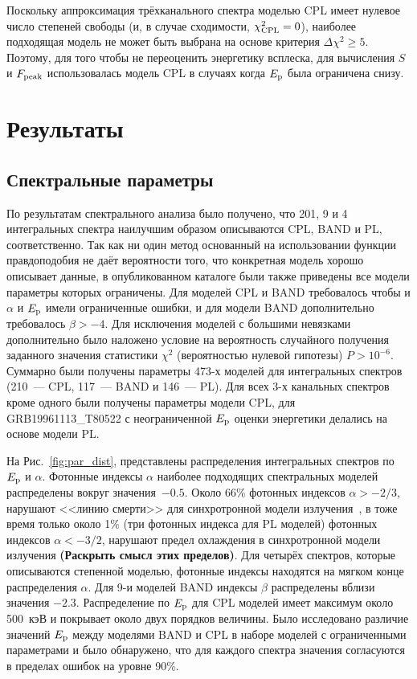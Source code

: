 Поскольку аппроксимация трёхканального спектра моделью CPL имеет нулевое число степеней свободы
(и, в случае сходимости, $\chi_{\mathrm{CPL}}^2=0$), наиболее подходящая модель 
не может быть выбрана на основе критерия $\Delta \chi^2 \geq 5$.
Поэтому, для того чтобы не переоценить энергетику всплеска, для вычисления $S$ и $F_{\mathrm{peak}}$
использовалась модель CPL в случаях когда $E_{\mathrm{p}}$ была ограничена снизу.

\section{Результаты}\label{sec:RESULTS}
\subsection{Спектральные параметры}
По результатам спектрального анализа было получено, что 201, 9 и 4 интегральных 
спектра наилучшим образом описываются CPL, BAND и PL, соответственно. 
Так как ни один метод основанный на использовании функции правдоподобия не даёт 
вероятности того, что конкретная модель хорошо описывает данные, в опубликованном 
каталоге были также приведены все модели параметры которых ограничены.
Для моделей CPL и BAND требовалось чтобы и $\alpha$ и $E_{\mathrm{p}}$ имели ограниченные ошибки,
и для модели BAND дополнительно требовалось $\beta > -4$. Для исключения моделей
с большими невязками дополнительно было наложено условие на вероятность 
случайного получения заданного значения статистики $\chi^2$ 
(вероятностью нулевой гипотезы) $P> 10^{-6}$. 
Суммарно были получены параметры 473-х моделей
для интегральных спектров (210~--- CPL, 117~--- BAND и 146~--- PL).
Для всех 3-х канальных спектров кроме одного были получены параметры модели CPL, для GRB19961113\_T80522 с 
неограниченной $E_{\mathrm{p}}$ оценки энергетики делались на основе модели PL\footnotemark. 


На Рис.~\ref{fig:par_dist}, представлены распределения интегральных спектров по $E_{\mathrm{p}}$ и $\alpha$.
Фотонные индексы $\alpha$ наиболее подходящих спектральных моделей распределены 
вокруг значения~$-0.5$. 
Около 66\% фотонных индексов $\alpha > -2/3$, нарушают <<линию смерти>> для 
синхротронной модели излучения~\citep{Preece_1998ApJL}, в тоже время только около 
1\% (три фотонных индекса для PL моделей) фотонных индексов $\alpha< -3/2$, 
нарушают предел охлаждения в синхротронной модели излучения \textbf{(Раскрыть смысл этих пределов)}. 
Для четырёх спектров, которые описываются степенной моделью, фотонные индексы 
находятся на мягком конце распределения $\alpha$. Для 9-и моделей BAND индексы $\beta$
распределены вблизи значения $-2.3$.
Распределение по $E_{\mathrm{p}}$ для CPL моделей имеет максимум около 500~кэВ 
и покрывает около двух порядков величины. 
Было исследовано различие значений $E_{\mathrm{p}}$ между моделями BAND и CPL в наборе 
моделей с ограниченными параметрами и было обнаружено, что для каждого спектра значения согласуются
в пределах ошибок на уровне 90\%.


